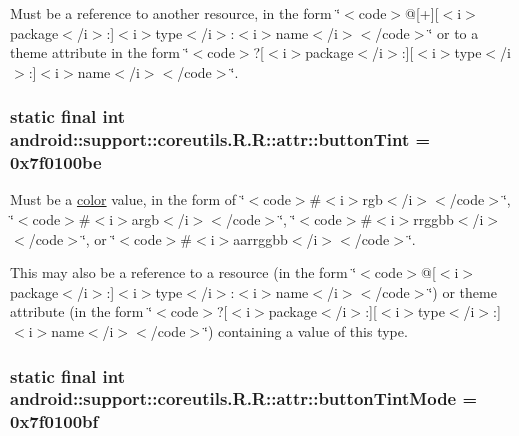Must be a reference to another resource, in the form \char`\"{}$<$code$>$@\mbox{[}+\mbox{]}\mbox{[}$<$i$>$package$<$/i$>$:\mbox{]}$<$i$>$type$<$/i$>$:$<$i$>$name$<$/i$>$$<$/code$>$\char`\"{} or to a theme attribute in the form \char`\"{}$<$code$>$?\mbox{[}$<$i$>$package$<$/i$>$:\mbox{]}\mbox{[}$<$i$>$type$<$/i$>$:\mbox{]}$<$i$>$name$<$/i$>$$<$/code$>$\char`\"{}. \hypertarget{classandroid_1_1support_1_1coreutils_1_1_r_1_1attr_eed910df109a8ad9fde9b3970e484186}{
\subsubsection[{buttonTint}]{\setlength{\rightskip}{0pt plus 5cm}static final int android::support::coreutils.R.R::attr::buttonTint = 0x7f0100be}}
\label{classandroid_1_1support_1_1coreutils_1_1_r_1_1attr_eed910df109a8ad9fde9b3970e484186}


Must be a \hyperlink{classandroid_1_1support_1_1coreutils_1_1_r_1_1color}{color} value, in the form of \char`\"{}$<$code$>$\#$<$i$>$rgb$<$/i$>$$<$/code$>$\char`\"{}, \char`\"{}$<$code$>$\#$<$i$>$argb$<$/i$>$$<$/code$>$\char`\"{}, \char`\"{}$<$code$>$\#$<$i$>$rrggbb$<$/i$>$$<$/code$>$\char`\"{}, or \char`\"{}$<$code$>$\#$<$i$>$aarrggbb$<$/i$>$$<$/code$>$\char`\"{}. 

This may also be a reference to a resource (in the form \char`\"{}$<$code$>$@\mbox{[}$<$i$>$package$<$/i$>$:\mbox{]}$<$i$>$type$<$/i$>$:$<$i$>$name$<$/i$>$$<$/code$>$\char`\"{}) or theme attribute (in the form \char`\"{}$<$code$>$?\mbox{[}$<$i$>$package$<$/i$>$:\mbox{]}\mbox{[}$<$i$>$type$<$/i$>$:\mbox{]}$<$i$>$name$<$/i$>$$<$/code$>$\char`\"{}) containing a value of this type. \hypertarget{classandroid_1_1support_1_1coreutils_1_1_r_1_1attr_32515bd82467fcdacafd5883f5f8548b}{
\subsubsection[{buttonTintMode}]{\setlength{\rightskip}{0pt plus 5cm}static final int android::support::coreutils.R.R::attr::buttonTintMode = 0x7f0100bf}}
\label{classandroid_1_1support_1_1coreutils_1_1_r_1_1attr_32515bd82467fcdacafd5883f5f8548b}


